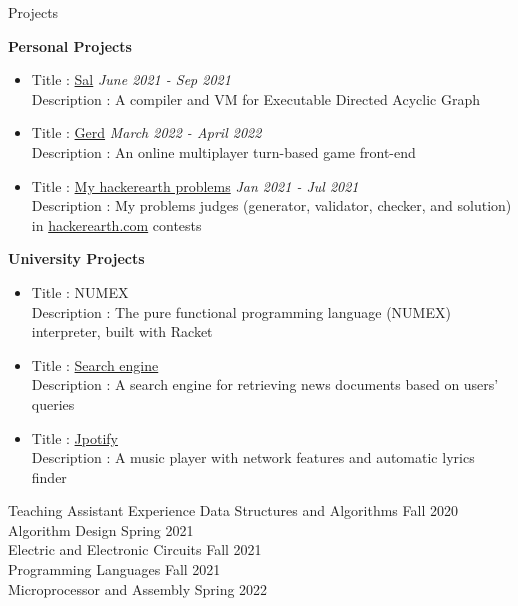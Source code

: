 \documentclass{resume} %
\begin{document}
\begin{rSection}{Projects}

 
\item 
    {\bf Personal Projects}
    \begin{itemize}
        \item
            Title : \href{https://github.com/amsen20/Sal}{Sal} \hfill {\em June 2021 - Sep 2021}
            \\
            Description : A compiler and VM for Executable Directed Acyclic Graph
        \item
            Title : \href{https://github.com/amsen20/gerd-front}{Gerd} \hfill {\em March 2022 - April 2022}
            \\
            Description : An online multiplayer turn-based game front-end
        \item
            Title : \href{https://github.com/amsen20/hackerearth-problems}{My hackerearth problems} \hfill {\em Jan 2021 - Jul 2021}
            \\
            Description : My problems judges (generator, validator, checker, and solution) in \href{https://www.hackerearth.com/}{hackerearth.com} contests
    \end{itemize}
    {\bf University Projects}
    \begin{itemize}
        \item
            Title : NUMEX
            \\
            Description : The pure functional programming language (NUMEX) interpreter, built with Racket
        \item
            Title : \href{https://github.com/amsen20/search-engine}{Search engine}
            \\
            Description : A search engine for retrieving news documents based on users' queries
        \item
            Title : \href{https://github.com/amsen20/Jpotify}{Jpotify}
            \\
            Description : A music player with network features and automatic lyrics finder
    \end{itemize}
\end{rSection}
\begin{rSection}{Teaching Assistant Experience}
    {Data Structures and Algorithms} \hfill {Fall 2020}\\
    {Algorithm Design} \hfill {Spring 2021}\\
    {Electric and Electronic Circuits} \hfill {Fall 2021}\\
    {Programming Languages} \hfill {Fall 2021}\\
    {Microprocessor and Assembly} \hfill {Spring 2022}\\
\end{rSection}
\end{document}
